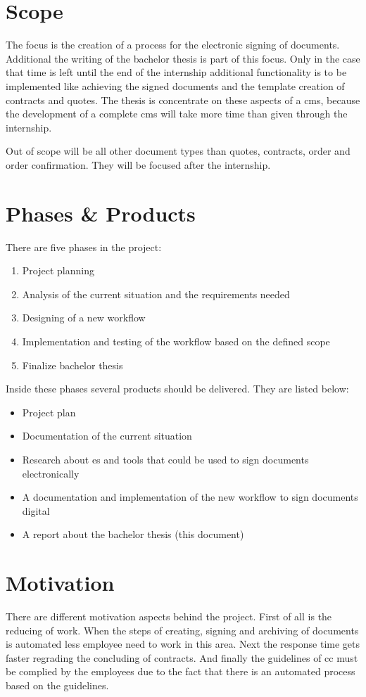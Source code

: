  \section{Scope}
 The focus is the creation of a process for the electronic signing of documents. Additional the writing of the bachelor thesis is part of this focus. Only in the case that time is left until the end of the internship additional functionality is to be implemented like achieving the signed documents and the template creation of contracts and quotes. The thesis is concentrate on these aspects of a \gls{cms}, because the development of a complete \gls{cms} will take more time than given through the internship. 
 
 Out of scope will be all other document types than quotes, contracts, order and order confirmation. They will be focused after the internship.
 
 \section{Phases \& Products} \label{sec:phases}
 There are five phases in the project:
 \begin{enumerate}
 	\item Project planning
 	\item Analysis of the current situation and the requirements needed
 	\item Designing of a new workflow
 	\item Implementation and testing of the workflow based on the defined scope
 	\item Finalize bachelor thesis
 \end{enumerate}
 
 Inside these phases several products should be delivered. They are listed below:
 \begin{itemize}
 	\item Project plan
 	\item Documentation of the current situation
 	\item Research about \gls{es} and tools that could be used to sign documents electronically
 	\item A documentation and implementation of the new workflow to sign documents digital
 	\item A report about the bachelor thesis (this document)
 \end{itemize}
 
 \section{Motivation}
 There are different motivation aspects behind the project. First of all is the reducing of work. When the steps of creating, signing and archiving of documents is automated less employee need to work in this area. Next the response time gets faster regrading the concluding of contracts. And finally the guidelines of \gls{cc} must be complied by the employees due to the fact that there is an automated process based on the guidelines. 